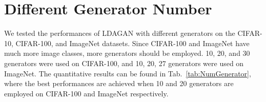 \documentclass{article}
\begin{document}
\begin{table}[h]
\caption{The performances of LDAGAN using different parameter sharing schemes}
\centering
\small\addtolength{\tabcolsep}{-0pt}
\qquad
{}
\label{tab:Sharing}
\end{table}



\section{Different Generator Number}
\label{App:ParShare}
We tested the performances of LDAGAN with different generators on the CIFAR-10, CIFAR-100, and ImageNet datasets.
Since CIFAR-100 and ImageNet have much more image classes, more generators should be employed.
10, 20, and 30 generators were used on CIFAR-100, and 10, 20, 27 generators were used on ImageNet.
The quantitative results can be found in Tab.~\ref{tab:NumGenerator}, where the best performances are achieved when 10 and 20 generators are employed on CIFAR-100 and ImageNet respectively.
\end{document}

